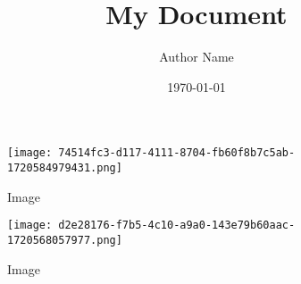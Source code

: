 \documentclass{article}
\title{My Document}\author{Author Name}\date{\today}
\begin{document}
\begin{wrapfigure}{l}{0.5364995602462621\textwidth}
\centering
\texttt{[image: 74514fc3-d117-4111-8704-fb60f8b7c5ab-1720584979431.png]}
\caption{Image}
\end{wrapfigure}\begin{wrapfigure}{r}{0.5668449197860963\textwidth}
\centering
\texttt{[image: d2e28176-f7b5-4c10-a9a0-143e79b60aac-1720568057977.png]}
\caption{Image}
\end{wrapfigure}
\end{document}
